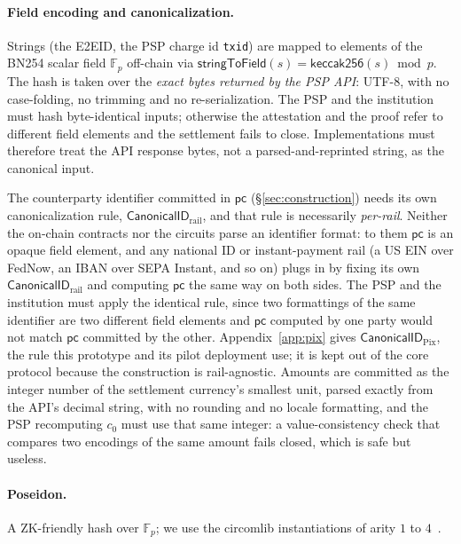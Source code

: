 \documentclass[11pt]{article}
\newcommand{\Fp}{\ensuremath{\mathbb{F}_p}}
\newcommand{\code}[1]{\texttt{#1}}
\begin{document}
\paragraph{Field encoding and canonicalization.} Strings (the E2EID, the PSP
charge id \code{txid}) are mapped to elements of the BN254 scalar field $\Fp$
off-chain via $\mathsf{stringToField}(s) = \mathsf{keccak256}(s) \bmod p$. The
hash is taken over the \emph{exact bytes returned by the PSP API}: UTF-8, with
no case-folding, no trimming and no re-serialization. The PSP and the
institution must hash byte-identical inputs; otherwise the attestation and the
proof refer to different field elements and the settlement fails to close.
Implementations must therefore treat the API response bytes, not a
parsed-and-reprinted string, as the canonical input.

\begingroup\sloppy
The counterparty identifier committed in $\mathsf{pc}$ (\S\ref{sec:construction})
needs its own canonicalization rule, $\mathsf{CanonicalID}_{\text{rail}}$, and
that rule is necessarily \emph{per-rail}. Neither the on-chain contracts nor
the circuits parse an identifier format: to them $\mathsf{pc}$ is an opaque
field element, and any national ID or instant-payment rail (a US EIN over
FedNow, an IBAN over SEPA Instant, and so on) plugs in by fixing its own
$\mathsf{CanonicalID}_{\text{rail}}$ and computing $\mathsf{pc}$ the same way on
both sides. The PSP and the institution must apply the identical rule, since two
formattings of the same identifier are two different field elements and
$\mathsf{pc}$ computed by one party would not match $\mathsf{pc}$ committed by
the other. Appendix~\ref{app:pix} gives $\mathsf{CanonicalID}_{\text{Pix}}$, the
rule this prototype and its pilot deployment use; it is kept out of the core
protocol because the construction is rail-agnostic. Amounts are committed as the
integer number of the settlement currency's smallest unit, parsed exactly from
the API's decimal string, with no rounding and no locale formatting, and the PSP
recomputing $c_0$ must use that same integer: a value-consistency check that
compares two encodings of the same amount fails closed, which is safe but
useless.\par\endgroup

\paragraph{Poseidon.} A ZK-friendly hash over $\Fp$; we use the circomlib
instantiations of arity $1$ to $4$~\cite{poseidon}.
\end{document}
